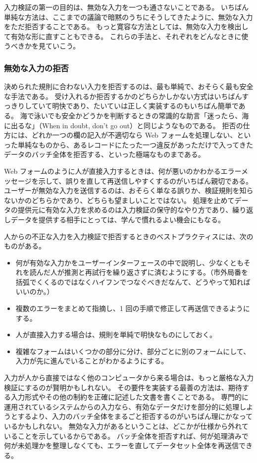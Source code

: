 \documentclass[uplatex]{jsarticle}
\begin{document}
入力検証の第一の目的は、無効な入力を一つも通さないことである。
いちばん単純な方法は、ここまでの議論で暗黙のうちにそうしてきたように、無効な入力をただ拒否することである。
もっと寛容な方法としては、無効な入力を検出して有効な形に直すこともできる。
これらの手法と、それぞれをどんなときに使うべきかを見ていこう。

\subsubsection{無効な入力の拒否}

決められた規則に合わない入力を拒否するのは、最も単純で、おそらく最も安全な手法である。
受け入れるか拒否するかのどちらかしかない方式はいちばんすっきりしていて明快であり、たいていは正しく実装するのもいちばん簡単である。
海で泳いでも安全かどうかを判断するときの常識的な助言「迷ったら、海に出るな」（When in doubt, don't go out）と同じようなものである。
拒否の仕方には、どれか一つの欄の記入が不適切なら Web フォームを処理しない、といった単純なものから、あるレコードにたった一つ違反があっただけで入ってきたデータのバッチ全体を拒否する、といった極端なものまである。

Web フォームのように人が直接入力するときは、何が悪いのかわかるエラーメッセージを示して、誤りを直して再送信しやすくするのがいちばん親切である。
ユーザーが無効な入力を送信するのは、おそらく単なる誤りか、検証規則を知らないかのどちらかであり、どちらも望ましいことではない。
処理を止めてデータの提供元に有効な入力を求めるのは入力検証の保守的なやり方であり、繰り返しデータを提供する相手にとっては、学んで慣れるよい機会にもなる。

人からの不正な入力を入力検証で拒否するときのベストプラクティスには、次のものがある。
\begin{itemize}
\item 何が有効な入力かをユーザーインターフェースの中で説明し、少なくともそれを読んだ人が推測と再試行を繰り返さずに済むようにする。（市外局番を括弧でくくるのではなくハイフンでつなぐべきだなんて、どうやって知ればいいのか。）
\item 複数のエラーをまとめて指摘し、1 回の手順で修正して再送信できるようにする。
\item 人が直接入力する場合は、規則を単純で明快なものにしておく。
\item 複雑なフォームはいくつかの部分に分け、部分ごとに別のフォームにして、入力が先に進んでいることがわかるようにする。
\end{itemize}

入力が人から直接ではなく他のコンピュータから来る場合は、もっと厳格な入力検証にするのが賢明かもしれない。
その要件を実装する最善の方法は、期待する入力形式やその他の制約を正確に記述した文書を書くことである。
専門的に運用されているシステムからの入力なら、有効なデータだけを部分的に処理しようとするより、入力のバッチ全体をまるごと拒否するのがいちばん理にかなっているかもしれない。
無効な入力があるということは、どこかが仕様から外れていることを示しているからである。
バッチ全体を拒否すれば、何が処理済みで何が未処理かを整理しなくても、エラーを直してデータセット全体を再送信できる。
\end{document}
